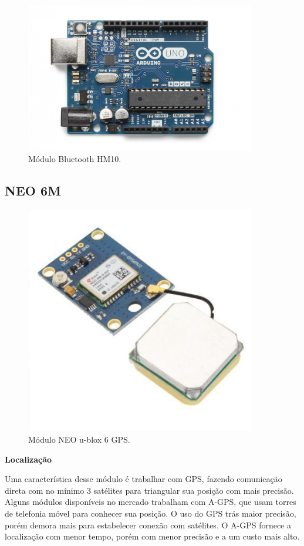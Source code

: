 \documentclass[
	12pt,				%
	oneside,			%
	a4paper,			%
	brazil				%
]{abntex2}
\begin{document}
\begin{figure}[!h]
\centering
\includegraphics[width=10cm, center]{images/arduino}
\caption{Módulo Bluetooth HM10.}
\label{Rotulo}
\end{figure}

\subsection{NEO 6M}

\begin{figure}[!h]
\centering
\includegraphics[width=10cm, center]{images/neo-6m}
\caption{Módulo NEO u-blox 6 GPS.}
\label{Rotulo}
\end{figure}

\textbf{Localização}

Uma característica desse módulo é trabalhar com GPS, fazendo comunicação direta com no mínimo 3 satélites para triangular sua posição com mais precisão. Alguns módulos disponíveis no mercado trabalham com A-GPS, que usam torres de telefonia móvel para conhecer sua posição.
O uso do GPS trás maior precisão, porém demora mais para estabelecer conexão com satélites. O A-GPS fornece a localização com menor tempo, porém com menor precisão e a um custo mais alto.
\end{document}
